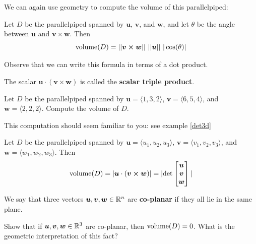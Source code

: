 We can again use geometry to compute the volume of this parallelpiped:

\begin{theorem}
    Let $D$ be the parallelpiped spanned by $\bm{u}$, $\bm{v}$, and $\bm{w}$, and let $\theta$ be the angle between $\bm{u}$ and $\bm{v \times w}$. Then $$\textnormal{volume}(D) = ||\bm{v \times w}|| \ ||\bm{u}|| \ |\cos(\theta)|$$
    \end{theorem}

Observe that we can write this formula in terms of a dot product.

\begin{definition}
        The scalar $\bm{u} \cdot (\bm{v \times w})$ is called the \textbf{scalar triple product}.
\end{definition}

\begin{example}
Let $D$ be the parallelpiped spanned by $\bm{u} = \langle 1, 3, 2 \rangle$, $\bm{v} = \langle 6, 5, 4 \rangle$, and $\bm{w} = \langle 2, 2, 2 \rangle$.  Compute the volume of $D$.

\end{example}

This computation should seem familiar to you: see example \ref{det3d}

\begin{theorem}
    Let $D$ be the parallelpiped spanned by $\bm{u} = \langle u_1, u_2, u_3 \rangle$, $\bm{v} = \langle v_1, v_2, v_3 \rangle$, and $\bm{w} = \langle w_1, w_2, w_3 \rangle$.  Then
    \begin{equation*}
\textnormal{volume}(D) = |\bm{u} \cdot (\bm{v \times w})| = | \textnormal{det}
\begin{bmatrix}
\bm{u} \\
\bm{v} \\
\bm{w} \\
\end{bmatrix}|
\end{equation*}

    \end{theorem}


\begin{example}
    \begin{definition}
        We say that three vectors $\bm{u}, \bm{v}, \bm{w} \in \mathbb{R}^n$ are \textbf{co-planar} if they all lie in the same plane. 
    \end{definition}
    
    Show that if $\bm{u}, \bm{v}, \bm{w} \in \mathbb{R}^3$ are co-planar, then $\textnormal{volume}(D) = 0$.  What is the geometric interpretation of this fact?
\end{example}

